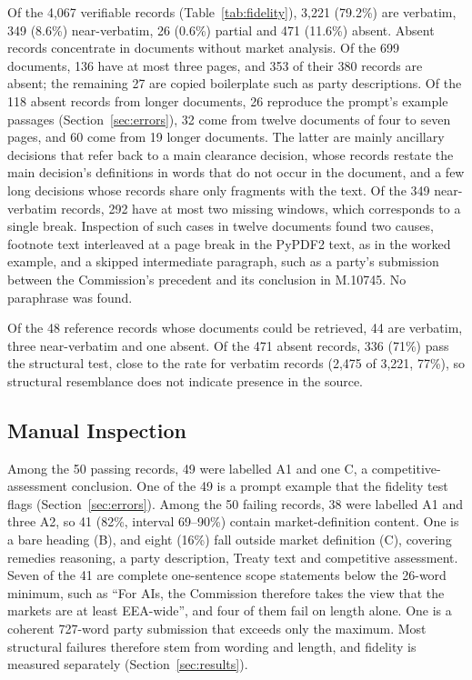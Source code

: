 \documentclass{IOS-Book-Article}
\begin{document}
Of the 4,067 verifiable records (Table~\ref{tab:fidelity}), 3,221 (79.2\%) are
verbatim, 349 (8.6\%) near-verbatim, 26 (0.6\%) partial and 471 (11.6\%)
absent. Absent records concentrate in documents without market analysis. Of the
699 documents, 136 have at most three pages, and 353 of their 380 records are
absent; the remaining 27 are copied boilerplate such as party descriptions. Of
the 118 absent records from longer documents, 26 reproduce the prompt's example
passages (Section~\ref{sec:errors}), 32 come from twelve documents of four to
seven pages, and 60 come from 19 longer documents. The latter are mainly
ancillary decisions that refer back to a main clearance decision, whose records
restate the main decision's definitions in words that do not occur in the
document, and a few long decisions whose records share only fragments with the
text. Of the 349 near-verbatim records, 292 have at most two missing windows,
which corresponds to a single break. Inspection of such cases in twelve
documents found two causes, footnote text interleaved at a page break in the
PyPDF2 text, as in the worked example, and a skipped intermediate paragraph,
such as a party's submission between the Commission's precedent and its
conclusion in M.10745. No paraphrase was found.

Of the 48 reference records whose documents could be retrieved, 44 are verbatim,
three near-verbatim and one absent. Of the 471 absent records, 336 (71\%) pass
the structural test, close to the rate for verbatim records (2,475 of 3,221,
77\%), so structural resemblance does not indicate presence in the source.

\subsection{Manual Inspection}

Among the 50 passing records, 49 were labelled A1 and one C, a
competitive-assessment conclusion. One of the 49 is a prompt example that the
fidelity test flags (Section~\ref{sec:errors}). Among the 50 failing records, 38
were labelled A1 and three A2, so 41 (82\%, interval 69--90\%) contain
market-definition content. One is a bare heading (B), and eight (16\%) fall
outside market definition (C), covering remedies reasoning, a party
description, Treaty text and competitive assessment. Seven of the 41 are
complete one-sentence scope statements below the 26-word minimum, such as ``For
AIs, the Commission therefore takes the view that the markets are at least
EEA-wide'', and four of them fail on length alone. One is a coherent 727-word
party submission that exceeds only the maximum. Most structural failures
therefore stem from wording and length, and fidelity is measured separately
(Section~\ref{sec:results}).
\end{document}
